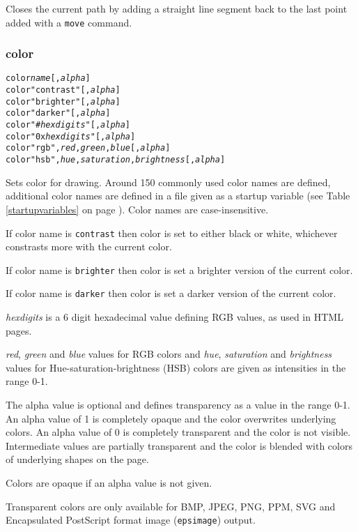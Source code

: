 Closes the current path by adding a straight line segment
back to the last point added with a \texttt{move} command.

\subsubsection{color}

\begin{alltt}
color \textit{name} [, \textit{alpha}]
color "contrast" [, \textit{alpha}]
color "brighter" [, \textit{alpha}]
color "darker" [, \textit{alpha}]
color "\#\textit{hexdigits}" [, \textit{alpha}]
color "0x\textit{hexdigits}" [, \textit{alpha}]
color "rgb", \textit{red}, \textit{green}, \textit{blue} [, \textit{alpha}]
color "hsb", \textit{hue}, \textit{saturation}, \textit{brightness} [, \textit{alpha}]
\end{alltt}

Sets color for drawing.  Around 150 commonly used color names are defined,
additional color names are defined in a file given as a startup variable (see
Table \ref{startupvariables} on page \pageref{startupvariables}).
Color names are case-insensitive.

If color name is \texttt{contrast} then color is set to either black or white,
whichever constrasts more with the current color.

If color name is \texttt{brighter} then color is set a brighter
version of the current color.

If color name is \texttt{darker} then color is set a darker
version of the current color.

\textit{hexdigits} is a 6 digit hexadecimal
value defining RGB values, as used in HTML pages.

\textit{red}, \textit{green} and \textit{blue} values for RGB colors and
\textit{hue}, \textit{saturation} and \textit{brightness} values for
Hue-saturation-brightness (HSB) colors are given as intensities in the range
0-1.

The alpha value is optional and defines transparency as a value in the range
0-1.  An alpha value of 1 is completely opaque and the color overwrites
underlying colors.  An alpha value of 0 is completely transparent and the color
is not visible.  Intermediate values are partially transparent and the color is
blended with colors of underlying shapes on the page.

Colors are opaque if an alpha value is not given.

Transparent colors are only available for BMP, JPEG, PNG, PPM, SVG
and Encapsulated PostScript format image (\texttt{epsimage}) output.

